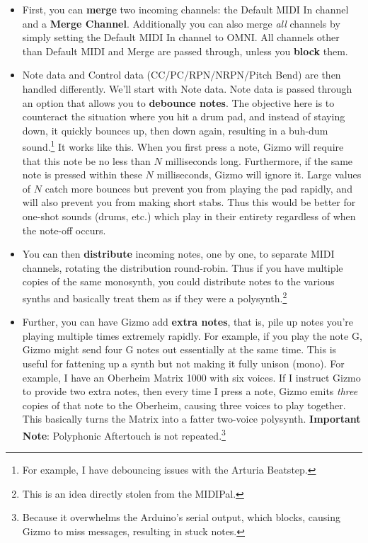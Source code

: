 \documentclass{article}
\begin{document}
\begin{itemize}
\item First, you can {\bf merge} two incoming channels: the Default MIDI In channel and a {\bf Merge Channel}.  Additionally you can also merge {\it all} channels by simply setting the Default MIDI In channel to OMNI.  All channels other than Default MIDI and Merge are passed through, unless you {\bf block} them.

\item Note data and Control data (CC/PC/RPN/NRPN/Pitch Bend) are then handled differently. We'll start with Note data.   Note data is passed through an option that allows you to {\bf debounce notes}.   The objective here is to counteract the situation where you hit a drum pad, and instead of staying down, it quickly bounces up, then down again, resulting in a buh-dum sound.\footnote{For example, I have debouncing issues with the Arturia Beatstep.}  It works like this.  When you first press a note, Gizmo will require that this note be no less than \(N\) milliseconds long.  Furthermore, if the same note is pressed within these \(N\) milliseconds, Gizmo will ignore it.     Large values of \(N\) catch more bounces but prevent you from playing the pad rapidly, and will also prevent you from making short stabs.  Thus this would be better for one-shot sounds (drums, etc.) which play in their entirety regardless of when the note-off occurs.

\item You can then {\bf distribute} incoming notes, one by one, to separate MIDI channels, rotating the distribution round-robin.  Thus if you have multiple copies of the same monosynth, you could distribute notes to the various synths and basically treat them as if they were a polysynth.\footnote{This is an idea directly stolen from the MIDIPal.}

\item Further, you can have Gizmo add {\bf extra notes}, that is, pile up notes you're playing multiple times extremely rapidly.  For example, if you play the note G, Gizmo might send four G notes out essentially at the same time.  This is useful for fattening up a synth but not making it fully unison (mono).  For example, I have an Oberheim Matrix 1000 with six voices.  If I instruct Gizmo to provide two extra notes, then every time I press a note, Gizmo emits {\it three} copies of that note to the Oberheim, causing three voices to play together.  This basically turns the Matrix into a fatter two-voice polysynth.  {\bf Important Note}: Polyphonic Aftertouch is not repeated.\footnote{\label{serialbuffer}Because it overwhelms the Arduino's serial output, which blocks, causing Gizmo to miss messages, resulting in stuck notes.}


\end{itemize}
\end{document}
